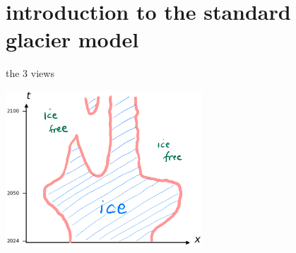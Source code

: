 \documentclass[10pt,dvipsnames]{beamer}
\theoremstyle{theorem}
\begin{document}
\AtBeginSection[]
{%
}

\section{introduction to the standard glacier model}

\begin{frame}{the 3 views}

\vspace{-2mm}
\begin{center}
\includegraphics[width=0.55\textwidth]{xtcrop}
\end{center}


\end{frame}
\end{document}
